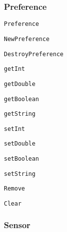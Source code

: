 \subsubsection*{Preference}


\begin{DoxyItemize}
\item {\tt Preference}
\begin{DoxyItemize}
\item {\tt New\-Preference}
\item {\tt Destroy\-Preference}
\item {\tt get\-Int}
\item {\tt get\-Double}
\item {\tt get\-Boolean}
\item {\tt get\-String}
\item {\tt set\-Int}
\item {\tt set\-Double}
\item {\tt set\-Boolean}
\item {\tt set\-String}
\item {\tt Remove}
\item {\tt Clear}
\end{DoxyItemize}
\end{DoxyItemize}

\subsubsection*{Sensor}


